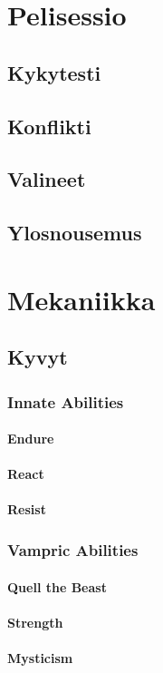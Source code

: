 \documentclass[a4paper, 12pt, finnish]{article}
\begin{document}
{\section{Pelisessio}
	\subsection{Kykytesti}
	\subsection{Konflikti}
	\subsection{Valineet}
	\subsection{Ylosnousemus}
\section{Mekaniikka}
	\subsection{Kyvyt}
		\subsubsection{Innate Abilities}
			\paragraph{Endure}
			\paragraph{React}
			\paragraph{Resist}
		\subsubsection{Vampric Abilities}
			\paragraph{Quell the Beast}
			\paragraph{Strength}
			\paragraph{Mysticism}
}
\end{document}
